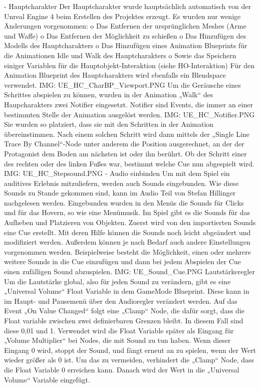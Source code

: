 -	Hauptcharakter
Der Hauptcharakter wurde hauptsächlich automatisch von der Unreal Engine 4 beim Erstellen des Projektes erzeugt. Es wurden nur wenige Änderungen vorgenommen:
o	Das Entfernen der ursprünglichen Meshes (Arme und Waffe)
o	Das Entfernen der Möglichkeit zu schießen
o	Das Hinzufügen des Modells des Hauptcharakters
o	Das Hinzufügen eines Animation Blueprints für die Animationen Idle und Walk des Hauptcharakters
o	Sowie das Speichern einiger Variablen für die Hauptobjekt-Interaktion (siehe HO-Interaktion)
Für den Animation Blueprint des Hauptcharakters wird ebenfalls ein Blendspace verwendet.
{IMG: UE_HC_CharBP_Viewport.PNG}
Um die Geräusche eines Schrittes abspielen zu können, wurden in der Animation „Walk“ des Haupcharakters zwei Notifier eingesetzt. Notifier sind Events, die immer an einer bestimmten Stelle der Animation ausgelöst werden.
{IMG: UE_HC_Notifier.PNG}
Sie wurden so platziert, dass sie mit den Schritten in der Animation übereinstimmen. Nach einem solchen Schritt wird dann mittels der „Single Line Trace By Channel“-Node unter anderem die Position ausgerechnet, an der der Protagonist dem Boden am nächsten ist oder ihn berührt.
Ob der Schritt einer des rechten oder des linken Fußes war, bestimmt welche Cue nun abgespielt wird.
{IMG: UE_HC_Stepsound.PNG}
-	Audio einbinden
Um mit dem Spiel ein auditives Erlebnis mitzuliefern, werden auch Sounds eingebunden. Wie diese Sounds zu Stande gekommen sind, kann im Audio Teil von Stefan Hillinger nachgelesen werden.
Eingebunden wurden in den Menüs die Sounds für Clicks und für das Hovern, so wie eine Menümusik. Im Spiel gibt es die Sounds für das Aufheben und Platzieren von Objekten.
Zuerst wird von den importierten Sounds eine Cue erstellt. Mit deren Hilfe können die Sounds noch leicht abgeändert und modifiziert werden. Außerdem können je nach Bedarf auch andere Einstellungen vorgenommen werden. Beispielweise besteht die Möglichkeit, einen oder mehrere weitere Sounds in die Cue einzufügen und dann bei jedem Abspielen der Cue einen zufälligen Sound abzuspielen.
{IMG: UE_Sound_Cue.PNG}
Lautstärkeregler
Um die Lautstärke global, also für jeden Sound zu verändern, gibt es eine „Universal Volume“ Float Variable in dem GameMode Blueprint. Diese kann in im Haupt- und Pausemenü über den Audioregler verändert werden. Auf das Event „On Value Changed“ folgt eine „Clamp“ Node, die dafür sorgt, dass die Float variable zwischen zwei definierbaren Grenzen bleibt. In diesem Fall sind diese 0,01 und 1.
Verwendet wird die Float Variable später als Eingang für „Volume Multiplier“ bei Nodes, die mit Sound zu tun haben. Wenn dieser Eingang 0 wird, stoppt der Sound, und fängt erneut an zu spielen, wenn der Wert wieder größer als 0 ist. Um das zu vermeiden, verhindert die „Clamp“ Node, dass die Float Variable 0 erreichen kann. Danach wird der Wert in die „Universal Volume“ Variable eingefügt.
